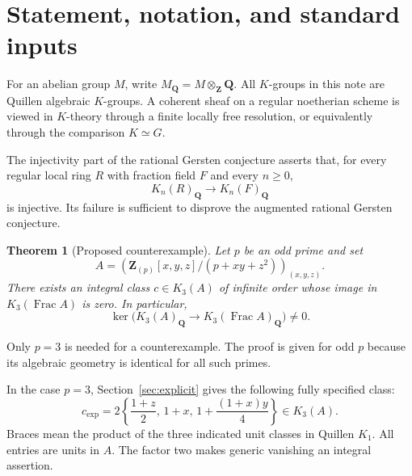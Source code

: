 \documentclass[11pt,a4paper]{article}
\newtheorem{theorem}{Theorem}[section]
\theoremstyle{remark}
\newcommand{\Q}{\mathbf Q}
\newcommand{\Z}{\mathbf Z}
\newcommand{\Frac}{\operatorname{Frac}}
\newcommand{\Qrat}{_{\Q}}
\begin{document}
\clearpage
{\small\setcounter{tocdepth}{1}\tableofcontents}
\bigskip

\section{Statement, notation, and standard inputs}

For an abelian group $M$, write $M\Qrat=M\otimes_{\Z}\Q$. All $K$-groups in this note are Quillen algebraic $K$-groups. A coherent sheaf on a regular noetherian scheme is viewed in $K$-theory through a finite locally free resolution, or equivalently through the comparison $K\simeq G$.

The injectivity part of the rational Gersten conjecture asserts that, for every regular local ring $R$ with fraction field $F$ and every $n\geq 0$,
\[
K_n(R)\Qrat\longrightarrow K_n(F)\Qrat
\]
is injective. Its failure is sufficient to disprove the augmented rational Gersten conjecture.

\begin{theorem}[Proposed counterexample]\label{thm:main}
Let $p$ be an odd prime and set
\[
A=\left(\Z_{(p)}[x,y,z]/(p+xy+z^2)\right)_{(x,y,z)}.
\]
There exists an integral class $c\in K_3(A)$ of infinite order whose image in $K_3(\Frac A)$ is zero. In particular,
\[
\ker\bigl(K_3(A)\Qrat\longrightarrow K_3(\Frac A)\Qrat\bigr)\neq 0.
\]
\end{theorem}

Only $p=3$ is needed for a counterexample. The proof is given for odd $p$ because its algebraic geometry is identical for all such primes.

In the case $p=3$, Section~\ref{sec:explicit} gives the following fully specified class:
\begin{equation}\label{eq:explicitfront}
\boxed{\quad
c_{\mathrm{exp}}=2\left\{\frac{1+z}{2},\,1+x,\,
1+\frac{(1+x)y}{4}\right\}\in K_3(A).
\quad}
\end{equation}
Braces mean the product of the three indicated unit classes in Quillen $K_1$. All entries are units in $A$. The factor two makes generic vanishing an integral assertion.
\end{document}
